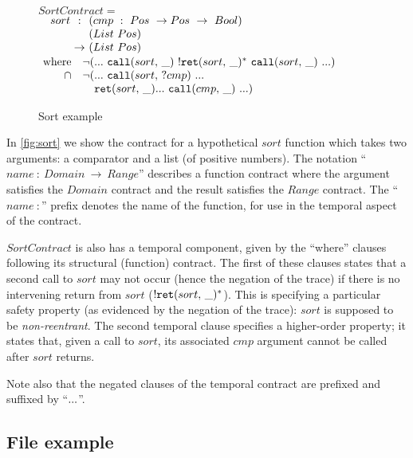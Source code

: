 \renewcommand*{\arraystretch}{1.2}
\newcommand*{\call}[1]{\scallev{#1}{\_}}
\newcommand*{\ret}[1]{\sretev{#1}{\_}}
\FloatBarrier
\begin{figure}
 $SortContract = $ \\
 $\begin{array}{ @{\quad}l@{\ } c @{\ }l }
 sort &:   &(cmp\ :\ Pos\ \to Pos\ \to\ Bool) \\
      &    &(List\ Pos) \\
      &\to &(List\ Pos) \\
 \end{array}$
 $\begin{array}{ @{~}r@{} l @{}l }
  \text{where}\quad
  &\stnot{(&\sddd~ \call{sort}~ \stmany{\snonevent{\ret{sort}}}~ \call{sort}~ \sddd)} \\
  \cap\quad
  &\stnot{(&\sddd~ \scallev{sort}{?cmp}~ \sddd~ \\
  &&\ret{sort} \sddd~ \call{cmp}~ \sddd)}
 \end{array}$
 \caption{Sort example}
 \label{fig:sort}
\end{figure}

In \autoref{fig:sort} we show the contract for a hypothetical $sort$ function which takes two arguments: a comparator and a list (of positive numbers).
%
The notation ``$\mathit{name}\ :\ Domain\ \to\ Range$'' describes a function contract where the argument satisfies the $Domain$ contract and the result satisfies the $Range$ contract.
%
The ``$\mathit{name}\ :$'' prefix denotes the name of the function, for use in the temporal aspect of the contract.

$SortContract$ is also has a temporal component, given by the ``where'' clauses following its structural (function) contract.
%
The first of these clauses states that a second call to $sort$ may not occur (hence the negation of the trace) if there is no intervening return from $sort$ ($\stmany{\snonevent{\ret{sort}}}$).
%
This is specifying a particular safety property (as evidenced by the negation of the trace): $sort$ is supposed to be \emph{non-reentrant}.
%
The second temporal clause specifies a higher-order property; it states that, given a call to $sort$, its associated $cmp$ argument cannot be called after $sort$ returns.

Note also that the negated clauses of the temporal contract are prefixed and suffixed by ``${\tt ...}$''.

\subsection{File example} \label{sec:file}

